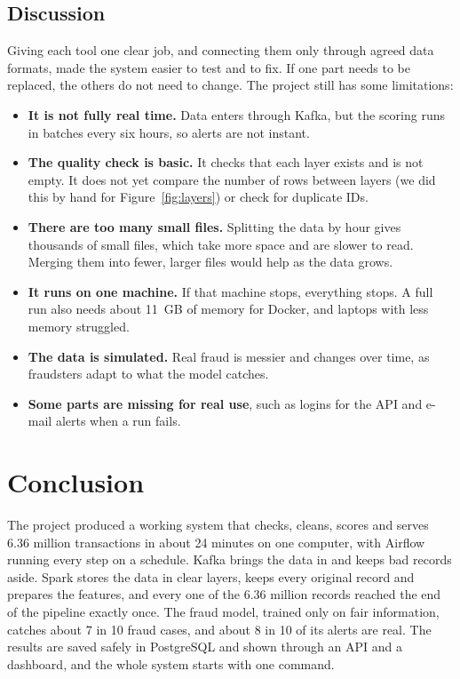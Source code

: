 \documentclass[11pt,a4paper]{article}
\begin{document}
\subsection{Discussion}
Giving each tool one clear job, and connecting them only through agreed data
formats, made the system easier to test and to fix. If one part needs to be
replaced, the others do not need to change. The project still has some
limitations:
\begin{itemize}
  \item \textbf{It is not fully real time.} Data enters through Kafka, but the
        scoring runs in batches every six hours, so alerts are not instant.
  \item \textbf{The quality check is basic.} It checks that each layer exists and
        is not empty. It does not yet compare the number of rows between layers
        (we did this by hand for Figure~\ref{fig:layers}) or check for duplicate
        IDs.
  \item \textbf{There are too many small files.} Splitting the data by hour gives
        thousands of small files, which take more space and are slower to read.
        Merging them into fewer, larger files would help as the data grows.
  \item \textbf{It runs on one machine.} If that machine stops, everything stops.
        A full run also needs about 11~GB of memory for Docker, and laptops with
        less memory struggled.
  \item \textbf{The data is simulated.} Real fraud is messier and changes over
        time, as fraudsters adapt to what the model catches.
  \item \textbf{Some parts are missing for real use}, such as logins for the API
        and e-mail alerts when a run fails.
\end{itemize}

\section{Conclusion}

The project produced a working system that checks, cleans, scores and serves
6.36 million transactions in about 24 minutes on one computer, with Airflow
running every step on a schedule. Kafka brings the data in and keeps bad records
aside. Spark stores the data in clear layers, keeps every original record and
prepares the features, and every one of the 6.36 million records reached the
end of the pipeline exactly once. The fraud model, trained only on fair
information, catches about 7 in 10 fraud cases, and about 8 in 10 of its alerts
are real. The results are saved safely in PostgreSQL and shown through an API
and a dashboard, and the whole system starts with one command.
\end{document}
